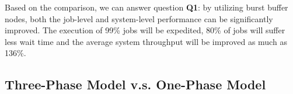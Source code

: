 
Based on the comparison, we can answer question \textbf{Q1}: by utilizing burst buffer nodes,
both the job-level and system-level performance can be significantly improved.
The execution of 99\% jobs will be expedited, 80\% of jobs will suffer less wait time and the 
average system throughput will be improved as much as 136\%.




\subsection{Three-Phase Model v.s. One-Phase Model}


